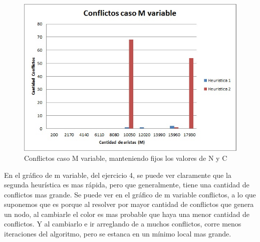 \begin{figure}[H]
  \begin{center}
      \includegraphics[scale=0.75]{../Ejercicio4MVariableConflictos.jpg}
  \end{center}
  \caption{Conflictos caso M variable, manteniendo fijos los valores de N y C }
\end{figure}

En el gráfico de m variable, del ejercicio 4, se puede ver claramente que la segunda heurística es mas rápida, pero que generalmente, tiene una cantidad de conflictos mas grande. Se puede ver en el gráfico de m variable conflictos, a lo que suponemos que es porque al resolver por mayor cantidad de conflictos que genera un nodo, al cambiarle el color es mas probable que haya una menor cantidad de conflictos. Y al cambiarlo e ir arreglando de a muchos conflictos, corre menos iteraciones del algoritmo, pero se estanca en un mínimo local mas grande.

